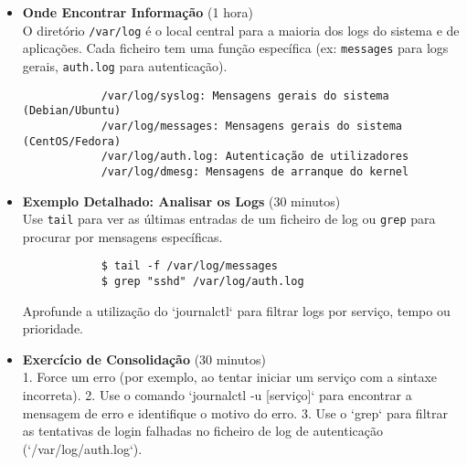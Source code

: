 \documentclass[10pt,a4paper]{article}
\begin{document}
	\begin{itemize}
		\item \textbf{Onde Encontrar Informação} (1 hora) \\
		O diretório \texttt{/var/log} é o local central para a maioria dos logs do sistema e de aplicações. Cada ficheiro tem uma função específica (ex: \texttt{messages} para logs gerais, \texttt{auth.log} para autenticação).
		\begin{verbatim}
			/var/log/syslog: Mensagens gerais do sistema (Debian/Ubuntu)
			/var/log/messages: Mensagens gerais do sistema (CentOS/Fedora)
			/var/log/auth.log: Autenticação de utilizadores
			/var/log/dmesg: Mensagens de arranque do kernel
		\end{verbatim}
		
		\item \textbf{Exemplo Detalhado: Analisar os Logs} (30 minutos) \\
		Use \texttt{tail} para ver as últimas entradas de um ficheiro de log ou \texttt{grep} para procurar por mensagens específicas.
		\begin{verbatim}
			$ tail -f /var/log/messages
			$ grep "sshd" /var/log/auth.log
		\end{verbatim}
		Aprofunde a utilização do `journalctl` para filtrar logs por serviço, tempo ou prioridade.
		
		\item \textbf{Exercício de Consolidação} (30 minutos) \\
		1. Force um erro (por exemplo, ao tentar iniciar um serviço com a sintaxe incorreta).
		2. Use o comando `journalctl -u [serviço]` para encontrar a mensagem de erro e identifique o motivo do erro.
		3. Use o `grep` para filtrar as tentativas de login falhadas no ficheiro de log de autenticação (`/var/log/auth.log`).
	\end{itemize}
	
\end{document}
